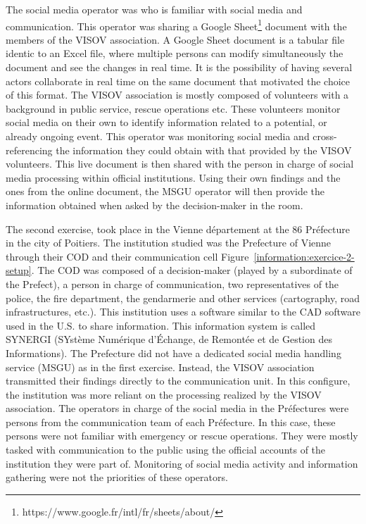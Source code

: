 The social media operator was who is familiar with social media and communication.
This operator was sharing a Google Sheet\footnote{https://www.google.fr/intl/fr/sheets/about/} document with the members of the VISOV association.
A Google Sheet document is a tabular file identic to an Excel file, where multiple persons can modify simultaneously the document and see the changes in real time.
It is the possibility of having several actors collaborate in real time on the same document that motivated the choice of this format.
The VISOV association is mostly composed of volunteers with a background in public service, rescue operations etc.
These volunteers monitor social media on their own to identify information related to a potential, or already ongoing event.
This operator was monitoring social media and cross-referencing the information they could obtain with that provided by the VISOV volunteers.
This live document is then shared with the person in charge of social media processing within official institutions.
Using their own findings and the ones from the online document, the MSGU operator will then provide the information obtained when asked by the decision-maker in the room.

The second exercise, took place in the Vienne département at the 86 Préfecture in the city of Poitiers.
The institution studied was the Prefecture of Vienne through their COD and their communication cell Figure~\ref{information:exercice-2-setup}.
The COD was composed of a decision-maker (played by a subordinate of the Prefect), a person in charge of communication, two representatives of the police, the fire department, the gendarmerie and other services (cartography, road infrastructures, etc.).
This institution uses a software similar to the CAD software used in the U.S. to share information.
This information system is called SYNERGI (SYstème Numérique d’Échange, de Remontée et de Gestion des Informations).
The Prefecture did not have a dedicated social media handling service (MSGU) as in the first exercise.
Instead, the VISOV association transmitted their findings directly to the communication unit.
In this configure, the institution was more reliant on the processing realized by the VISOV association.
The operators in charge of the social media in the Préfectures were persons from the communication team of each Préfecture.
In this case, these persons were not familiar with emergency or rescue operations.
They were mostly tasked with communication to the public using the official accounts of the institution they were part of.
Monitoring of social media activity and information gathering were not the priorities of these operators.

